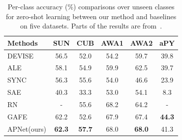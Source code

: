 \documentclass[letterpaper]{article} %
\begin{document}
\begin{table}[t!]
\centering
\caption{Per-class accuracy (\%) comparisons over unseen classes for zero-shot learning between our method and baselines on five datasets. Parts of the results are from~\cite{xian2018zero}.
}
\begin{tabular}{l|c|c|c|c|c}
\toprule
\textbf{Methods}    & \textbf{SUN}  & \textbf{CUB} & \textbf{AWA1} & \textbf{AWA2} & \textbf{aPY}\\
\midrule
DEVISE~\cite{frome2013devise}  & 56.5 & 52.0 & 54.2 & 59.7 & 39.8 \\
ALE~\cite{akata2015label} & 58.1 & 54.9 & 59.9 & 62.5 & 39.7 \\
SYNC~\cite{changpinyo2016synthesized} & 56.3 & 55.6 & 54.0 & 46.6 & 23.9 \\
SAE~\cite{kodirov2017semantic} & 40.3 & 33.3 & 53.0 & 54.1 & 8.3  \\
RN~\cite{sung2018learning} & - & 55.6 & 68.2 & 64.2 & - \\
GAFE~\cite{ijcai2019-graph-auto} & 62.2 & 52.6 & 67.9 & 67.4 & \textbf{44.3} \\
\midrule
APNet(ours) & \textbf{62.3} & \textbf{57.7}  & 68.0  & \textbf{68.0} &  41.3 \\
\bottomrule
\end{tabular}
\label{table:results-zs}
\end{table}
\end{document}

